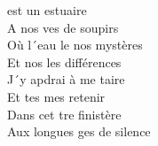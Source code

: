  est un estuaire \\
A nos ves de soupirs \\
Où l´eau le nos mystères \\
Et nos les différences \\
J´y apdrai à me taire \\
Et tes mes retenir \\
Dans cet tre finistère \\
Aux longues ges de silence \songwordfb{}